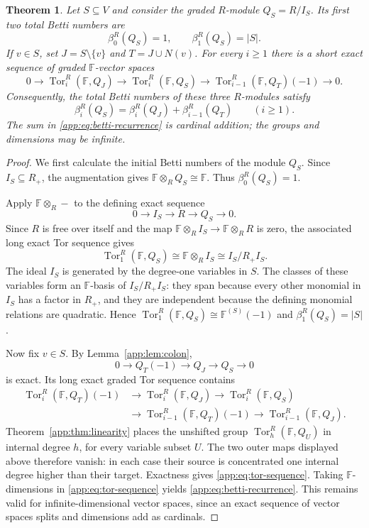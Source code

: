 \documentclass[11pt]{article}
\numberwithin{equation}{section}
\newtheorem{theorem}{Theorem}[section]
\theoremstyle{definition}
\theoremstyle{remark}
\newcommand{\Tor}{\operatorname{Tor}}
\begin{document}
\begin{theorem}\label{app:thm:rec}
Let $S\subseteq V$ and consider the graded $R$-module $Q_S=R/I_S$.
Its first two total Betti numbers are
\[
\beta_0^R(Q_S)=1,
\qquad
\beta_1^R(Q_S)=|S|.
\tag{5}\label{app:eq:initial-betti}
\]
If $v\in S$, set $J=S\setminus\{v\}$ and $T=J\cup N(v)$.
For every $i\ge1$ there is a short exact sequence of graded
$\mathbb F$-vector spaces
\[
0\longrightarrow\Tor_i^R(\mathbb F,Q_J)
\longrightarrow\Tor_i^R(\mathbb F,Q_S)
\longrightarrow\Tor_{i-1}^R(\mathbb F,Q_T)(-1)
\longrightarrow0.
\tag{6}\label{app:eq:tor-sequence}
\]
Consequently, the total Betti numbers of these three $R$-modules satisfy
\[
\beta_i^R(Q_S)
 =\beta_i^R(Q_J)+\beta_{i-1}^R(Q_T)
\qquad(i\ge1).
\tag{7}\label{app:eq:betti-recurrence}
\]
The sum in \eqref{app:eq:betti-recurrence} is cardinal addition; the groups and dimensions may
be infinite.
\end{theorem}
\begin{proof}
We first calculate the initial Betti numbers of the module $Q_S$.
Since $I_S\subseteq R_+$, the augmentation gives
$\mathbb F\otimes_R Q_S\cong\mathbb F$.  Thus
$\beta_0^R(Q_S)=1$.

Apply $\mathbb F\otimes_R-$ to the defining exact sequence
\[
0\longrightarrow I_S\longrightarrow R\longrightarrow Q_S
\longrightarrow0.
\]
Since $R$ is free over itself and the map
$\mathbb F\otimes_R I_S\to\mathbb F\otimes_R R$ is zero,
the associated long exact Tor sequence gives
\[
\Tor_1^R(\mathbb F,Q_S)
 \cong\mathbb F\otimes_R I_S
 \cong I_S/R_+I_S.
\]
The ideal $I_S$ is generated by the degree-one variables in $S$.
The classes of these variables form an $\mathbb F$-basis of
$I_S/R_+I_S$: they span because every other monomial in $I_S$
has a factor in $R_+$, and they are independent because the defining
monomial relations are quadratic.  Hence
$\Tor_1^R(\mathbb F,Q_S)\cong\mathbb F^{(S)}(-1)$
and $\beta_1^R(Q_S)=|S|$.

Now fix $v\in S$.  By Lemma~\ref{app:lem:colon},
\[
0\longrightarrow Q_T(-1)\longrightarrow Q_J
\longrightarrow Q_S\longrightarrow0
\]
is exact.  Its long exact graded Tor sequence contains
\[
\begin{aligned}
\Tor_i^R(\mathbb F,Q_T)(-1)
 &\longrightarrow\Tor_i^R(\mathbb F,Q_J)
 \longrightarrow\Tor_i^R(\mathbb F,Q_S)\\
 &\longrightarrow\Tor_{i-1}^R(\mathbb F,Q_T)(-1)
 \longrightarrow\Tor_{i-1}^R(\mathbb F,Q_J).
\end{aligned}
\]
Theorem~\ref{app:thm:linearity} places the unshifted group
$\Tor_h^R(\mathbb F,Q_U)$ in internal degree $h$, for every
variable subset $U$.  The two outer maps displayed above therefore
vanish: in each case their source is concentrated one internal degree
higher than their target.  Exactness gives \eqref{app:eq:tor-sequence}.
Taking $\mathbb F$-dimensions in \eqref{app:eq:tor-sequence} yields \eqref{app:eq:betti-recurrence}.  This remains
valid for infinite-dimensional vector spaces, since an exact
sequence of vector spaces splits and dimensions add as cardinals.
\end{proof}
\end{document}
